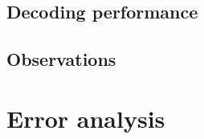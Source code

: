 \documentclass[]{article}
\begin{document}
\subsection{Decoding performance}

\subsection{Observations}

\section{Error analysis}




\end{document}
